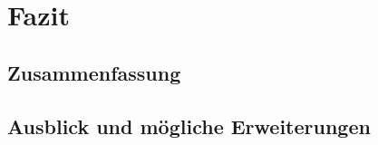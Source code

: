 \chapter{Fazit}
\label{fazit}


\section{Zusammenfassung}
\label{zusammenfassung}


\section{Ausblick und mögliche Erweiterungen}
\label{ausblick_und_mögliche_erweiterungen}

